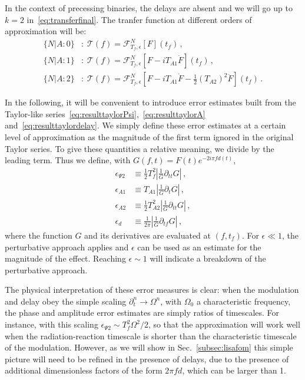 \documentclass[aps,showpacs,twocolumn,
prd,superscriptaddress,nofootinbib]{revtex4-1}
\newcommand\calF{{\mathcal{F}}}
\newcommand\calT{{\mathcal{T}}}
\newcommand{\Tf}{T_{f}}
\begin{document}
In the context of precessing binaries, the delays are absent and we will go up to $k=2$ in~\eqref{eq:transferfinal}. The tranfer function at different orders of approximation will be:
\begin{subequations}\label{eq:summaryNA}
\begin{align}
	\{N | A:0\}&: \; \calT(f) = \calF^{N}_{\Tf, \epsilon} \left[ F \right] (t_{f}) \,, \\
	\{N | A:1\}&: \; \calT(f) = \calF^{N}_{\Tf, \epsilon} \left[ F - i T_{A1} \dot{F} \right] (t_{f}) \,, \\
	\{N | A:2\}&: \; \calT(f) = \calF^{N}_{\Tf, \epsilon} \left[ F - i T_{A1} \dot{F} - \frac{1}{2} (T_{A2})^{2} \ddot{F} \right] (t_{f}) \,.
\end{align}
\end{subequations}

In the following, it will be convenient to introduce error estimates built from the Taylor-like series~\eqref{eq:resulttaylorPsi},~\eqref{eq:resulttaylorA} and~\eqref{eq:resulttaylordelay}. We simply define these error estimates at a certain level of approximation as the magnitude of the first term ignored in the original Taylor series. To give these quantities a relative meaning, we divide by the leading term. Thus we define, with $G(f,t) = F(t) e^{-2i\pi f d(t)}$,
\begin{subequations}\label{eq:deffom}
\begin{align}
	\epsilon_{\Psi 2} &\equiv \frac{1}{2} \Tf^{2} \left| \frac{1}{G}\partial_{tt}G \right| \,, \\
	\epsilon_{A 1} &\equiv T_{A1} \left| \frac{1}{G} \partial_{t} G \right| \,, \\
	\epsilon_{A 2} &\equiv \frac{1}{2} T_{A2}^{2} \left| \frac{1}{G} \partial_{tt}G \right| \,, \\
	\epsilon_{d} &\equiv \frac{1}{2\pi} \left| \frac{1}{G} \partial_{tf} G \right| \,,
\end{align}
\end{subequations}
where the function $G$ and its derivatives are evaluated at $(f, t_{f})$. For $\epsilon \ll 1$, the perturbative approach applies and $\epsilon$ can be used as an estimate for the magnitude of the effect. Reaching $\epsilon \sim 1$ will indicate a breakdown of the perturbative approach.

The physical interpretation of these error measures is clear: when the modulation and delay obey the simple scaling $\partial_{t}^{n} \rightarrow \Omega^{n}$, with $\Omega_{0}$ a characteristic frequency, the phase and amplitude error estimates are simply ratios of timescales. For instance, with this scaling $\epsilon_{\Psi 2} \sim T_{f}^{2}\Omega^{2}/2$, so that the approximation will work well when the radiation-reaction timescale is shorter than the characteristic timescale of the modulation. However, as we will show in Sec.~\ref{subsec:lisafom} this simple picture will need to be refined in the presence of delays, due to the presence of additional dimensionless factors of the form $2\pi f d$, which can be larger than 1.
\end{document}
